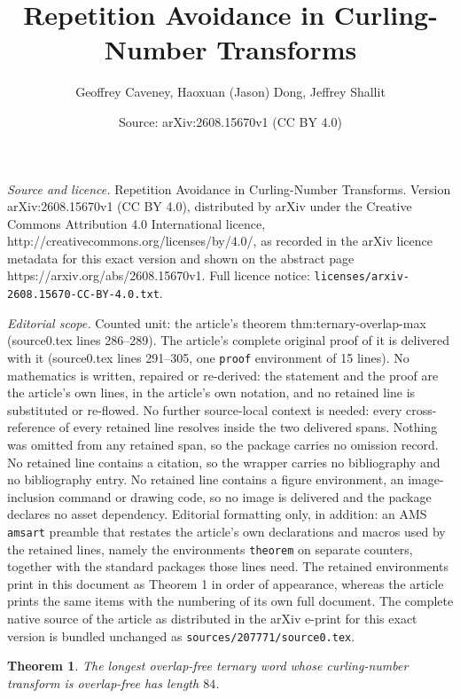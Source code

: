 \documentclass[10pt,a4paper]{amsart}
\title{Repetition Avoidance in Curling-Number Transforms}
\author{Geoffrey Caveney, Haoxuan (Jason) Dong, Jeffrey Shallit}
\date{Source: arXiv:2608.15670v1 (CC BY 4.0)}
\newtheorem{theorem}{Theorem}
\begin{document}
\maketitle

\noindent\emph{Source and licence.} Repetition Avoidance in Curling-Number Transforms. Version arXiv:2608.15670v1 (CC BY 4.0), distributed by arXiv under the Creative Commons Attribution 4.0 International licence, http://creativecommons.org/licenses/by/4.0/, as recorded in the arXiv licence metadata for this exact version and shown on the abstract page https://arxiv.org/abs/2608.15670v1. Full licence notice: \texttt{licenses/arxiv-2608.15670-CC-BY-4.0.txt}.\par\smallskip

\noindent\textit{Editorial scope.} Counted unit: the article's theorem thm:ternary-overlap-max (source0.tex lines 286--289). The article's complete original proof of it is delivered with it (source0.tex lines 291--305, one \texttt{proof} environment of 15 lines). No mathematics is written, repaired or re-derived: the statement and the proof are the article's own lines, in the article's own notation, and no retained line is substituted or re-flowed.  No further source-local context is needed: every cross-reference of every retained line resolves inside the two delivered spans.  Nothing was omitted from any retained span, so the package carries no omission record.  No retained line contains a citation, so the wrapper carries no bibliography and no bibliography entry.  No retained line contains a figure environment, an image-inclusion command or drawing code, so no image is delivered and the package declares no asset dependency.  Editorial formatting only, in addition: an AMS \texttt{amsart} preamble that restates the article's own declarations and macros used by the retained lines, namely the environments \texttt{theorem} on separate counters, together with the standard packages those lines need.  The retained environments print in this document as Theorem 1 in order of appearance, whereas the article prints the same items with the numbering of its own full document.  The complete native source of the article as distributed in the arXiv e-print for this exact version is bundled unchanged as \texttt{sources/207771/source0.tex}.
\begin{theorem} 
The longest overlap-free ternary word whose curling-number transform is overlap-free has length $84$.
\label{thm:ternary-overlap-max}
\end{theorem}
\end{document}
